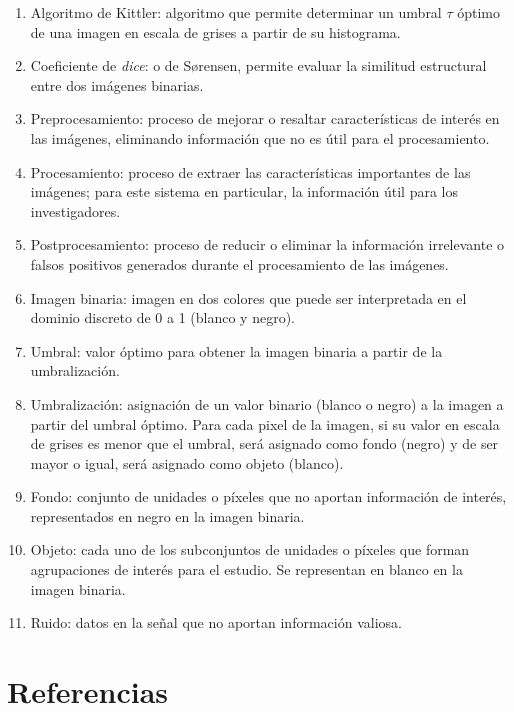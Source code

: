 \documentclass{scrreprt}
\begin{document}
\begin{enumerate}[label=\alph*.]
\item Algoritmo de Kittler: algoritmo que permite determinar un umbral $\tau$ óptimo de una imagen en escala de grises a partir de su histograma.
\item Coeficiente de \textit{dice}: o de Sørensen, permite evaluar la similitud estructural entre dos imágenes binarias.
\item Preprocesamiento: proceso de mejorar o resaltar características de interés en las imágenes, eliminando información que no es útil para el procesamiento.
\item Procesamiento: proceso de extraer las características importantes de las imágenes; para este sistema en particular, la información útil para los investigadores.
\item Postprocesamiento: proceso de reducir o eliminar la información irrelevante o falsos positivos generados durante el procesamiento de las imágenes.
\item Imagen binaria: imagen en dos colores que puede ser interpretada en el dominio discreto de 0 a 1 (blanco y negro).
\item Umbral: valor óptimo para obtener la imagen binaria a partir de la umbralización.
\item Umbralización: asignación de un valor binario (blanco o negro) a la imagen a partir del umbral óptimo. Para cada pixel de la imagen, si su valor en escala de grises es menor que el umbral, será asignado como fondo (negro) y de ser mayor o igual, será asignado como objeto (blanco).
\item Fondo: conjunto de unidades o píxeles que no aportan información de interés, representados en negro en la imagen binaria.
\item Objeto: cada uno de los subconjuntos de unidades o píxeles que forman agrupaciones de interés para el estudio. Se representan en blanco en la imagen binaria.
\item Ruido: datos en la señal que no aportan información valiosa.
\end{enumerate}


\chapter{Referencias}
\end{document}
